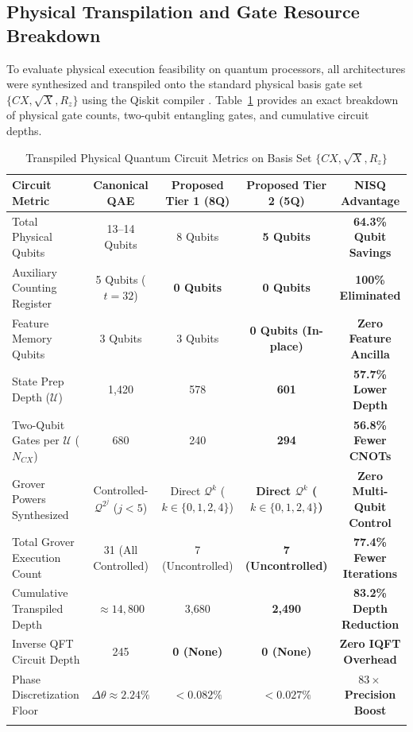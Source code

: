 \documentclass[sn-mathphys,Numbered]{sn-jnl}
\theoremstyle{thmstyleone}
\theoremstyle{thmstyletwo}
\theoremstyle{thmstylethree}
\begin{document}
\subsection{Physical Transpilation and Gate Resource Breakdown}\label{subsec5.1}

To evaluate physical execution feasibility on quantum processors, all architectures were synthesized and transpiled onto the standard physical basis gate set $\{CX, \sqrt{X}, R_z\}$ using the Qiskit compiler \cite{aleksandrowicz2019qiskit}. Table~\ref{tab3} provides an exact breakdown of physical gate counts, two-qubit entangling gates, and cumulative circuit depths.

\begin{table}[ht]
\caption{Transpiled Physical Quantum Circuit Metrics on Basis Set $\{CX, \sqrt{X}, R_z\}$}\label{tab3}%
\centering
\fontsize{7.5bp}{9.2bp}\selectfont
\setlength{\tabcolsep}{3.5pt}
\begin{tabular}{@{}lcccc@{}}
\toprule
\textbf{Circuit Metric} & \textbf{Canonical QAE \cite{khadiev2026quantum}} & \textbf{Proposed Tier 1 (8Q)} & \textbf{Proposed Tier 2 (5Q)} & \textbf{NISQ Advantage} \\
\midrule
Total Physical Qubits & 13--14 Qubits & 8 Qubits & \textbf{5 Qubits} & \textbf{64.3\% Qubit Savings} \\
Auxiliary Counting Register & 5 Qubits ($t=32$) & \textbf{0 Qubits} & \textbf{0 Qubits} & \textbf{100\% Eliminated} \\
Feature Memory Qubits & 3 Qubits & 3 Qubits & \textbf{0 Qubits (In-place)} & \textbf{Zero Feature Ancilla} \\
State Prep Depth ($\mathcal{U}$) & 1,420 & 578 & \textbf{601} & \textbf{57.7\% Lower Depth} \\
Two-Qubit Gates per $\mathcal{U}$ ($N_{CX}$) & 680 & 240 & \textbf{294} & \textbf{56.8\% Fewer CNOTs} \\
Grover Powers Synthesized & Controlled-$\mathcal{Q}^{2^j}$ ($j{<}5$) & Direct $\mathcal{Q}^k$ ($k \in \{0,1,2,4\}$) & \textbf{Direct $\mathcal{Q}^k$ ($k \in \{0,1,2,4\}$)} & \textbf{Zero Multi-Qubit Control} \\
Total Grover Execution Count & 31 (All Controlled) & 7 (Uncontrolled) & \textbf{7 (Uncontrolled)} & \textbf{77.4\% Fewer Iterations} \\
Cumulative Transpiled Depth & $\approx 14,800$ & 3,680 & \textbf{2,490} & \textbf{83.2\% Depth Reduction} \\
Inverse QFT Circuit Depth & 245 & \textbf{0 (None)} & \textbf{0 (None)} & \textbf{Zero IQFT Overhead} \\
Phase Discretization Floor & $\Delta\theta \approx 2.24\%$ & \textbf{$< 0.082\%$} & \textbf{$< 0.027\%$} & \textbf{$83\times$ Precision Boost} \\
\botrule
\end{tabular}
\end{table}
\end{document}
